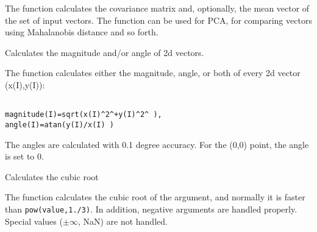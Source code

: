 The function calculates the covariance matrix
and, optionally, the mean vector of the set of input vectors. The function
can be used for PCA, for comparing vectors using Mahalanobis distance and so forth.

Calculates the magnitude and/or angle of 2d vectors.


\begin{description}
\end{description}

The function calculates either the magnitude, angle, or both of every 2d vector (x(I),y(I)):

\begin{lstlisting}

magnitude(I)=sqrt(x(I)^2^+y(I)^2^ ),
angle(I)=atan(y(I)/x(I) )

\end{lstlisting}

The angles are calculated with 0.1 degree accuracy. For the (0,0) point, the angle is set to 0.

Calculates the cubic root


\begin{description}
\end{description}


The function calculates the cubic root of the argument, and normally it is faster than \texttt{pow(value,1./3)}. In addition, negative arguments are handled properly. Special values ($\pm \infty $, NaN) are not handled.

